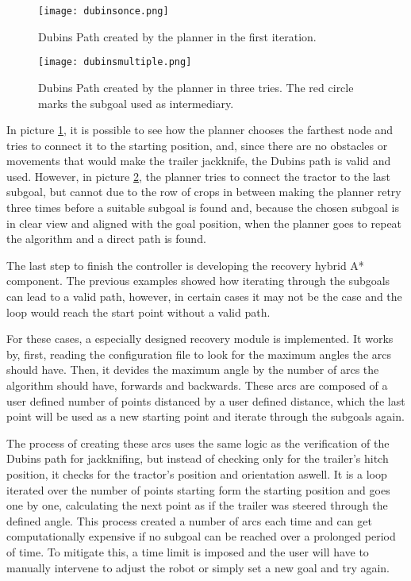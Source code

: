 \begin{figure}[h]
    \centering
    \texttt{[image: dubinsonce.png]}
    \caption{Dubins Path created by the planner in the first iteration.}
    \label{fig:dubins_path1}
\end{figure}
\begin{figure}[h]
    \centering
    \texttt{[image: dubinsmultiple.png]}
    \caption{Dubins Path created by the planner in three tries. The red circle marks the subgoal used as intermediary.}
    \label{fig:dubins_path2}
\end{figure}

In picture \ref{fig:dubins_path1}, it is possible to see how the planner chooses the farthest node and tries 
to connect it to the starting position, and, since there are no obstacles or movements that would make 
the trailer jackknife, the Dubins path is valid and used. However, in picture \ref{fig:dubins_path2}, the 
planner tries to connect the tractor to the last subgoal, but cannot due to the row of crops in between 
making the planner retry three times before a suitable subgoal is found and, because the chosen subgoal 
is in clear view and aligned with the goal position, when the planner goes to repeat the algorithm 
and a direct path is found.

The last step to finish the controller is developing the recovery hybrid A* component. The previous 
examples showed how iterating through the subgoals can lead to a valid path, however, in certain cases 
it may not be the case and the loop would reach the start point without a valid path.

For these cases, a especially designed recovery module is implemented. It works by, first, reading the 
configuration file to look for the maximum angles the arcs should have. Then, it devides the maximum 
angle by the number of arcs the algorithm should have, forwards and backwards. These arcs are composed 
of a user defined number of points distanced by a user defined distance, which the last point will be 
used as a new starting point and iterate through the subgoals again.

The process of creating these arcs uses the same logic as the verification of the Dubins path for 
jackknifing, but instead of checking only for the trailer's hitch position, it checks for the tractor's 
position and orientation aswell. It is a loop iterated over the number of points starting form the starting position 
and goes one by one, calculating the next point as if the trailer was steered through the defined angle. This 
process created a number of arcs each time and can get computationally expensive if no subgoal can 
be reached over a prolonged period of time. To mitigate this, a time limit is imposed and the user will have 
to manually intervene to adjust the robot or simply set a new goal and try again.

